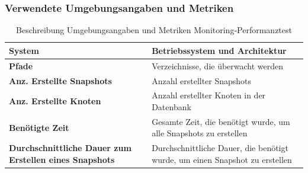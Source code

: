 \documentclass[a4paper,12pt]{report}
\begin{document}
    \subsubsection{Verwendete Umgebungsangaben und Metriken}\label{subsubsec:monitoring-perftest-metrics-title}
    \begin{table}[h!]
        \centering
        \setlength{\leftmargini}{0.8cm}
        \begin{tabular}{|p{7cm}|p{7cm}|}
            \hline
            \textbf{System}                                               & Betriebssystem und Architektur                                             \\ \hline
            \textbf{Pfade}                                                & Verzeichnisse, die überwacht werden                                        \\ \hline
            \textbf{Anz. Erstellte Snapshots}                             & Anzahl erstellter Snapshots                                                \\ \hline
            \textbf{Anz. Erstellte Knoten}                                & Anzahl erstellter Knoten in der Datenbank                                  \\ \hline
            \textbf{Benötigte Zeit}                                       & Gesamte Zeit, die benötigt wurde, um alle Snapshots zu erstellen           \\ \hline
            \textbf{Durchschnittliche Dauer zum Erstellen eines Snapshots} & Durchschnittliche Dauer, die benötigt wurde, um einen Snapshot zu erstellen \\ \hline
        \end{tabular}
        \caption{Beschreibung Umgebungsangaben und Metriken Monitoring-Performanztest}\label{tab:monitoring-perftest-metrics}
    \end{table}
\end{document}

